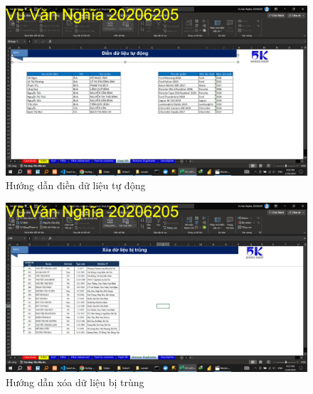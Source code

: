 \documentclass{article}
\begin{document}
\begin{figure}[h]
\centering
\includegraphics[scale = 0.15]{Video1/HuongDan/11.png}
\caption{Hướng dẫn điền dữ liệu tự động}
\end{figure}

\begin{figure}[h]
\centering
\includegraphics[scale = 0.15]{Video1/HuongDan/12.png}
\caption{Hướng dẫn xóa dữ liệu bị trùng}
\end{figure}
\end{document}
